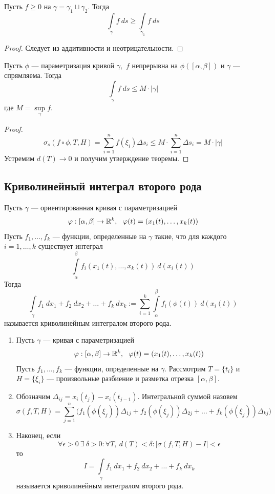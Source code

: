 \begin{statement}
    Пусть $f\geq 0$ на $\gamma=\gamma_1\sqcup\gamma_2$. Тогда
    \[\int\limits_{\gamma}f\ ds\geq \int\limits_{\gamma_1}f\ ds\]
\end{statement}
\begin{proof}
    Следует из аддитивности и неотрицательности.
\end{proof}
\begin{statement}
    Пусть $\phi$ --- параметризация кривой $\gamma$,\ $f$ непрерывна на $\phi([\alpha,\beta])$ и $\gamma$ --- спрямляема. Тогда
    \[\int\limits_{\gamma}f\ ds\leq M\cdot |\gamma|\]
    где $M=\sup\limits_{\gamma}f$.
\end{statement}
\begin{proof}
    \[\sigma_s(f\circ\phi,T,H)=\sum\limits_{i=1}^{n}f(\xi_i)\Delta s_i\leq M\cdot \sum\limits_{i=1}^{n}\Delta s_i=M\cdot |\gamma|\]
    Устремим $d(T)\to 0$ и получим утверждение теоремы.
\end{proof}
\subsection{Криволинейный интеграл второго рода}
\begin{definition}
    Пусть $\gamma$ --- ориентированная кривая с параметризацией 
    \[\phi:[\alpha,\beta]\to \R^k,\ \ \phi(t)=(x_1(t),\dots,x_k(t))\]
    Пусть $f_1,\dots,f_k$ --- функции, определенные на $\gamma$ такие, что для каждого\\
    $i=1,\dots,k$ существует интеграл
    \[\int\limits_{\alpha}^{\beta}f_i(x_1(t),\dots,x_k(t))\ d(x_i(t))\]
    Тогда
    \[\int\limits_{\gamma}f_1\ dx_1+f_2\ dx_2+\dots+f_k\ dx_k := \sum\limits_{i=1}^{k}\int\limits_{\alpha}^{\beta}f_i(\phi(t))\ d(x_i(t))\]
    называется криволинейным интегралом второго рода.
\end{definition}
\begin{definition}\tab
    \begin{enumerate}
        \item Пусть $\gamma$ --- кривая с параметризацией 
        \[\phi:[\alpha,\beta]\to \R^k,\ \ \phi(t)=(x_1(t),\dots,x_k(t))\]
        Пусть $f_1,\dots,f_k$ --- функции, определенные на $\gamma$. Рассмотрим $T=\{t_i\}$ и\\
        $H=\{\xi_i\}$ --- произвольные разбиение и разметка отрезка $[\alpha,\beta]$.\
        \item Обозначим $\Delta_{ij}=x_i(t_j)-x_i(t_{j-1})$. Интегральной суммой назовем
        \[\sigma(f,T,H)=\sum\limits_{j=1}^{n}\Big(f_1(\phi(\xi_j))\Delta_{1j}+f_2(\phi(\xi_j))\Delta_{2j}+\dots+f_k(\phi(\xi_j))\Delta_{kj}\Big)\]
        \item Наконец, если
        \[\forall \epsilon>0\ \exists\ \delta>0: \forall T,\ d(T)<\delta: |\sigma(f,T,H)-I|<\epsilon\]
        то 
        \[I=\int\limits_{\gamma}f_1\ dx_1+f_2\ dx_2+\dots+f_k\ dx_k\]
        называется криволинейным интегралом второго рода.
    \end{enumerate}
\end{definition}
